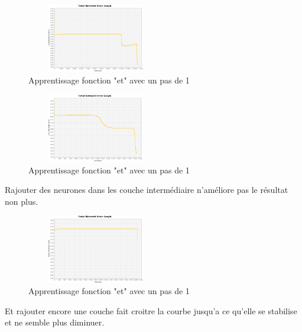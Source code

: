 \documentclass[twoside,openright,a4paper,11pt,french]{article}
\begin{document}
\begin{figure}[h]
\includegraphics[width=6cm,height=3cm]{./pics/eq/multi_6_6_def.eps}
\caption{Apprentissage fonction "et" avec un pas de 1}
\label{fig:anderr4}
\end{figure}

\begin{figure}[h]
\includegraphics[width=6cm,height=3cm]{./pics/eq/multi_3_4_def.eps}
\caption{Apprentissage fonction "et" avec un pas de 1}
\label{fig:anderr4}
\end{figure}


Rajouter des neurones dans les couche intermédiaire n'améliore pas le résultat non plus.

\begin{figure}[h]
\centering
\includegraphics[width=6cm,height=3cm]{./pics/eq/multi_3_3_3_def.eps}
\caption{Apprentissage fonction "et" avec un pas de 1}
\label{fig:anderr4}
\end{figure}


Et rajouter encore une couche fait croitre la courbe jusqu'a ce qu'elle se
stabilise et ne semble plus diminuer.

\end{document}
